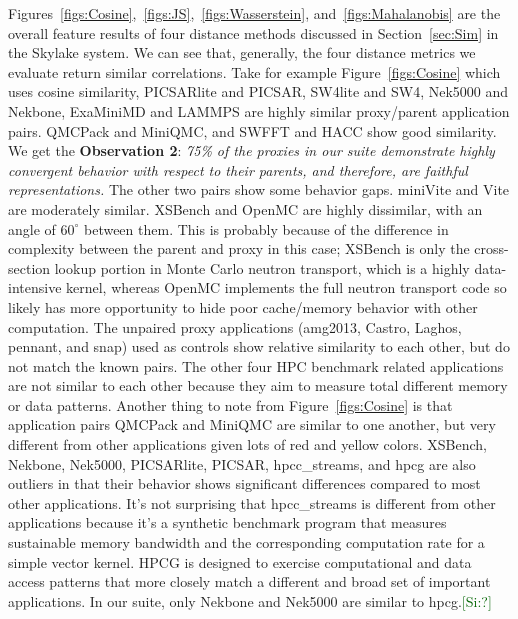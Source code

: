 \documentclass[conference]{IEEEtran}
\newcommand{\si}[1]           {\textcolor{darkgreen}{[Si:#1]}}
\begin{document}
Figures~\ref{figs:Cosine},~\ref{figs:JS},~\ref{figs:Wasserstein}, and~\ref{figs:Mahalanobis} are the overall feature results of four distance methods discussed in Section~\ref{sec:Sim} in the Skylake system. We can see that, generally, the four distance metrics we evaluate return similar correlations. Take for example Figure~\ref{figs:Cosine} which uses cosine similarity, PICSARlite and PICSAR, SW4lite and SW4, Nek5000 and Nekbone, ExaMiniMD and LAMMPS are highly similar proxy/parent application pairs. QMCPack and MiniQMC, and SWFFT and HACC show good similarity.  We get the \textbf{Observation 2}: \textit{75\% of the proxies in our suite demonstrate highly convergent behavior with respect to their parents, and therefore, are faithful representations.} The other two pairs show some behavior gaps. miniVite and Vite are moderately similar. XSBench and OpenMC are highly dissimilar, with an angle of $60^\circ$ between them. This is probably because of the difference in complexity between the parent and proxy in this case; XSBench is only the cross-section lookup portion in Monte Carlo neutron transport, which is a highly data-intensive kernel, whereas OpenMC implements the full neutron transport code so likely has more opportunity to hide poor cache/memory behavior with other computation. The unpaired proxy applications (amg2013, Castro, Laghos, pennant, and snap) used as controls show relative similarity to each other, but do not match the known pairs. The other four HPC benchmark related applications are not similar to each other because they aim to measure total different memory or data patterns. Another thing to note from Figure~\ref{figs:Cosine} is that application pairs QMCPack and MiniQMC are similar to one another, but very different from other applications given lots of red and yellow colors. XSBench, Nekbone, Nek5000, PICSARlite, PICSAR, hpcc\_streams, and hpcg are also outliers in that their behavior shows significant differences compared to most other applications.  It's not surprising that hpcc\_streams is different from other applications because it's a synthetic benchmark program that measures sustainable memory bandwidth and the corresponding computation rate for a simple vector kernel. HPCG is designed to exercise computational and data access patterns that more closely match a different and broad set of important applications. In our suite, only Nekbone and Nek5000 are similar to hpcg.\si{?}
\end{document}
